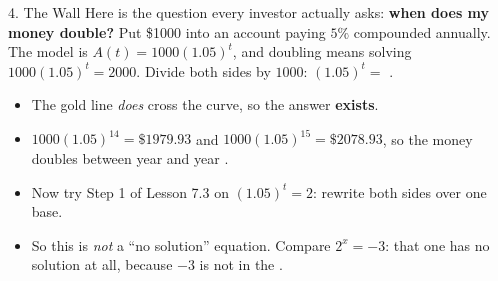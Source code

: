 \documentclass[10pt]{article}
\begin{document}
\boxguard[30]
\begin{notesbox}{4. The Wall}
Here is the question every investor actually asks: \textbf{when does my money double?} Put \$1000 into
an account paying $5\%$ compounded annually. The model is $A(t)=1000(1.05)^{t}$, and doubling means
solving $1000(1.05)^{t}=2000$. Divide both sides by $1000$: \; $(1.05)^{t}=$ .

\vspace{3pt}

\begin{center}
\begin{minipage}[c]{0.46\linewidth}
\centering
{}
\end{minipage}
\begin{minipage}[c]{0.50\linewidth}
\small
\begin{itemize}[leftmargin=1.3em, itemsep=2pt]
  \item The gold line \emph{does} cross the curve, so the answer \textbf{exists}.
  \item $1000(1.05)^{14}=\$1979.93$ and $1000(1.05)^{15}=\$2078.93$, so the money doubles between year
         and year .
  \item Now try Step 1 of Lesson 7.3 on $(1.05)^{t}=2$: rewrite both sides over one base.
  \item So this is \emph{not} a ``no solution'' equation. Compare $2^{x}=-3$: that one has no solution
        at all, because $-3$ is not in the .
\end{itemize}
\end{minipage}
\end{center}


\end{notesbox}
\end{document}
